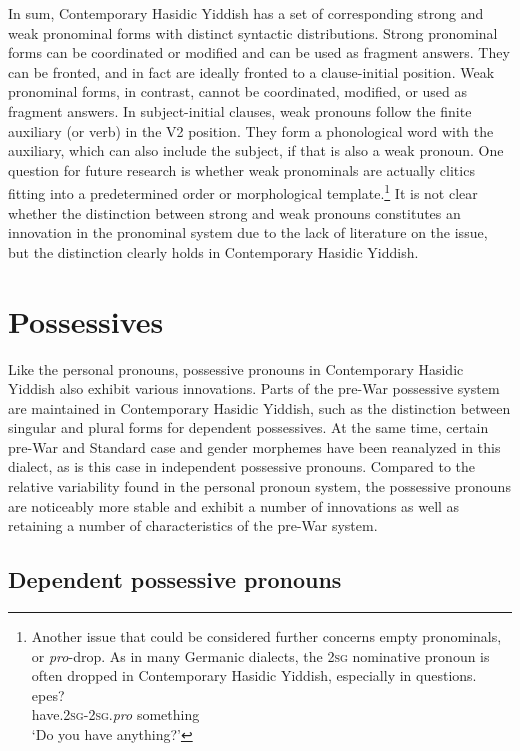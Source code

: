 \documentclass[output=paper, hidelinks]{langscibook}
\begin{document}
In sum, Contemporary Hasidic Yiddish has a set of corresponding strong and weak pronominal forms with distinct syntactic distributions. Strong pronominal forms can be coordinated or modified and can be used as fragment answers. They can be fronted, and in fact are ideally fronted to a clause-initial position. Weak pronominal forms, in contrast, cannot be coordinated, modified, or used as fragment answers. In subject-initial clauses, weak pronouns follow the finite auxiliary (or verb) in the V2 position. They form a phonological word with the auxiliary, which can also include the subject, if that is also a weak pronoun. One question for future research is whether weak pronominals are actually clitics fitting into a predetermined order or morphological template.\footnote{Another issue that could be considered further concerns empty pronominals, or \textit{pro}-drop. As in many Germanic dialects, the 2\textsc{sg} nominative pronoun is often dropped in Contemporary Hasidic Yiddish, especially in questions.
\ea {} epes?\\
have.2\textsc{sg}-2\textsc{sg}.\textit{pro} something\\
\glt `Do you have anything?’
\z

} It is not clear whether the distinction between strong and weak pronouns constitutes an innovation in the pronominal system due to the lack of literature on the issue, but the distinction clearly holds in Contemporary Hasidic Yiddish.

\section{Possessives}\label{sec:possessives}


Like the personal pronouns, possessive pronouns in Contemporary Hasidic Yiddish also exhibit various innovations. Parts of the pre-War possessive system are maintained in Contemporary Hasidic Yiddish, such as the distinction between singular and plural forms for dependent possessives. At the same time, certain pre-War and Standard case and gender morphemes have been reanalyzed in this dialect, as is this case in independent possessive pronouns. Compared to the relative variability found in the personal pronoun system, the possessive pronouns are noticeably more stable and exhibit a number of innovations as well as retaining a number of characteristics of the pre-War system.


\subsection{Dependent possessive pronouns}\label{sec:depposs}
\end{document}
